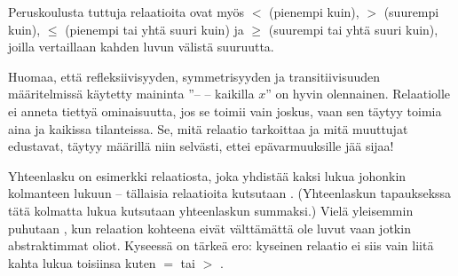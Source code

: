 Peruskoulusta tuttuja relaatioita ovat myös $<$ (pienempi kuin), $>$ (suurempi kuin), $\leq$ (pienempi tai yhtä suuri kuin) ja $\geq$ (suurempi tai yhtä suuri kuin), joilla vertaillaan kahden luvun välistä suuruutta.

\begin{esimerkki}
\end{esimerkki}

Huomaa, että refleksiivisyyden, symmetrisyyden ja transitiivisuuden määritelmissä käytetty maininta ''-- -- kaikilla $x$'' on hyvin olennainen. Relaatiolle ei anneta tiettyä ominaisuutta, jos se toimii vain joskus, vaan sen täytyy toimia aina ja kaikissa tilanteissa. Se, mitä relaatio tarkoittaa ja mitä muuttujat edustavat, täytyy määrillä niin selvästi, ettei epävarmuuksille jää sijaa!


Yhteenlasku on esimerkki relaatiosta, joka yhdistää kaksi lukua johonkin kolmanteen lukuun -- tällaisia relaatioita kutsutaan . (Yhteenlaskun tapauksekssa tätä kolmatta lukua kutsutaan yhteenlaskun summaksi.) Vielä yleisemmin puhutaan , kun relaation kohteena eivät välttämättä ole luvut vaan jotkin abstraktimmat oliot. Kyseessä on tärkeä ero: kyseinen relaatio ei siis vain liitä kahta lukua toisiinsa kuten $=$ tai $>$ .